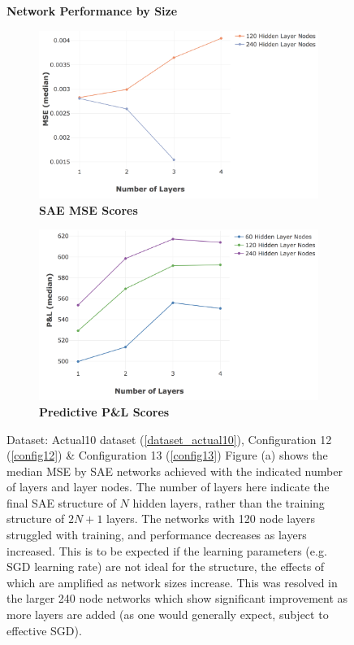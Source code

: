 \documentclass[a4paper,11pt,oneside]{article}
\theoremstyle{plain}
\theoremstyle{definition}
\begin{document}
	\begin{figure}[H]
		\centering
		\textbf{Network Performance by Size}
		\begin{subfigure}{.99\textwidth}
			\centering 
			\includegraphics[scale=0.4]{images/results/8_7_network/actual_mse_lines.png}
			\caption{\textbf{SAE MSE Scores} 
				\newline }
			\label{figure-actual_mse_lines}
		\end{subfigure}
		\begin{subfigure}{.99\textwidth}
			\centering 
			\includegraphics[scale=0.4]{images/results/8_7_network/actual_pl_lines.png}
			\caption{\textbf{Predictive P\&L Scores} 
				\newline }
			\label{figure-actual_pl_lines}
		\end{subfigure}
		\caption[Network Performance by Size]
		{Dataset: Actual10 dataset (\ref{dataset_actual10}), Configuration 12 (\ref{config12}) \& Configuration 13 (\ref{config13})
			\newline Figure (a) shows the median MSE by SAE networks achieved with the indicated number of layers and layer nodes. The number of layers here indicate the final SAE structure of $N$ hidden layers, rather than the training structure of $2N + 1$ layers. The networks with 120 node layers struggled with training, and performance decreases as layers increased. This is to be expected if the learning parameters (e.g. SGD  learning rate) are not ideal for the structure, the effects of which are amplified as network sizes increase. This was resolved in the larger 240 node networks which show significant improvement as more layers are added (as one would generally expect, subject to effective SGD).
}
\end{figure}
\end{document}
